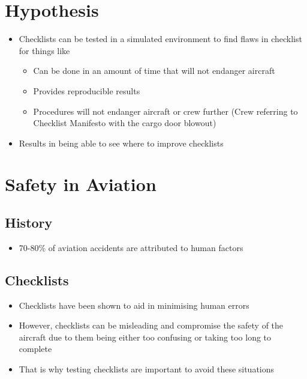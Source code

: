\documentclass[../dissertation.tex]{subfiles}
\begin{document}
\section{Hypothesis}
\begin{itemize}
    \item Checklists can be tested in a simulated environment 
      to find flaws in checklist for things like
      \begin{itemize}
        \item Can be done in an amount of time that will not endanger aircraft
        \item Provides reproducible results
        \item Procedures will not endanger aircraft or crew further (Crew referring to Checklist Manifesto with the cargo door blowout)
      \end{itemize}
    \item Results in being able to see where to improve checklists
\end{itemize}


\section{Safety in Aviation}
\subsection{History}
\begin{itemize}
  \item 70-80\% of aviation accidents are attributed to human factors~\cite{faa-reasons}
\end{itemize}

\subsection{Checklists}
\begin{itemize}
  \item Checklists have been shown to aid in minimising human errors~\cite{manifesto}
  \item However, checklists can be misleading and compromise the safety of the aircraft
    due to them being either too confusing or taking too long to complete~\cite{nasa-design}
  \item That is why testing checklists are important to avoid these situations
\end{itemize}
\end{document}

